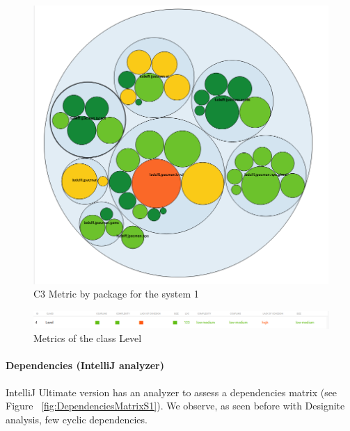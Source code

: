\documentclass{article}
\begin{document}
\begin{figure}
    \centering
    \includegraphics[scale=0.5]{imgs/CodeMRByPackage.PNG}
    \caption{C3 Metric by package for the system 1}
    \label{fig:CodeMRByPackage}
\end{figure}

\begin{figure}
    \centering
    \includegraphics[width=\linewidth]{imgs/CodeMRLevelMetrics.PNG}
    \caption{Metrics of the class Level}
    \label{fig:CodeMRLevelClassQuality}
\end{figure}

\paragraph{Dependencies (IntelliJ analyzer)}

IntelliJ Ultimate version has an analyzer to assess a dependencies matrix (see Figure ~\ref{fig:DependenciesMatrixS1}). We observe, as seen before with Designite analysis, few cyclic dependencies.
\end{document}
